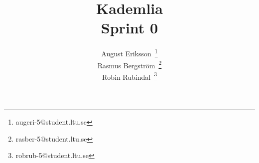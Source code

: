 \documentclass[a4paper]{article}
\title{Kademlia\\ \medskip{}
  \large{Sprint 0}
}
\author{
  August Eriksson~\thanks{augeri-5@student.ltu.se}\\
  Rasmus Bergström~\thanks{rasber-5@student.ltu.se}\\
  Robin Rubindal~\thanks{robrub-5@student.ltu.se}\\
}
\begin{document}
\maketitle
\newpage



\newpage




\appendix{}
\newpage






\end{document}
